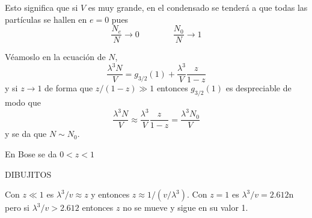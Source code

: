 \documentclass[10pt,oneside]{CBFT_book}
\begin{document}
Esto significa que si $V$ es muy grande, en el condensado se tenderá a que todas las partículas se hallen en
$ e = 0 $ pues 
\[
	\frac{N_e}{N} \to 0 \qquad \qquad \frac{N_0}{N} \to 1
\]

Véamoslo en la ecuación de $N$,
\[
	\frac{\lambda^3 N}{V} = g_{3/2}(1) + \frac{\lambda^3}{V} \frac{z}{1-z}
\]
y si $z \to 1$ de forma que $z/(1-z) \gg 1$ entonces $g_{3/2}(1)$ es despreciable de modo que
\[
	\frac{\lambda^3 N}{V} \approx \frac{\lambda^3}{V} \frac{z}{1-z} = \frac{\lambda^3 N_0}{V} 
\]
y se da que $ N \sim N_0 $.

En Bose se da $ 0 < z < 1$

DIBUJITOS

Con $ z \ll 1$ es $ \lambda^3 / v \approx z $ y entonces $ z \approx 1/ (v/\lambda^3) $.
Con $ z=1 $ es $ \lambda^3 / v = 2.612$n pero si $ \lambda^3 / v > 2.612 $ entonces $z$ no se mueve y
sigue en su valor 1.

\end{document}
